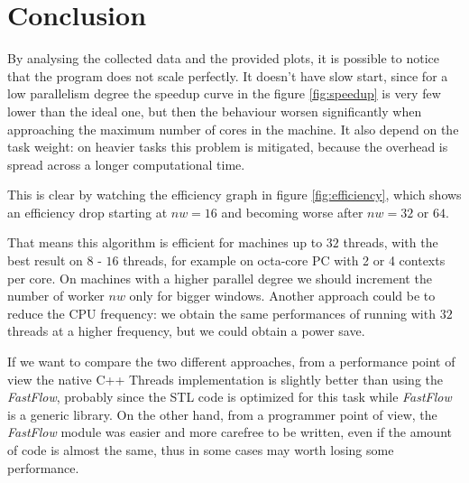 \section{Conclusion}
By analysing the collected data and the provided plots, it is possible to notice that the program does not scale perfectly. It doesn't have slow start, since for a low parallelism degree the speedup curve in the figure \ref{fig:speedup} is very few lower than the ideal one, but then the behaviour worsen significantly when approaching the maximum number of cores in the machine. It also depend on the task weight: on heavier tasks this problem is mitigated, because the overhead is spread across a longer computational time.

This is clear by watching the efficiency graph in figure \ref{fig:efficiency}, which shows an efficiency drop starting at $nw = 16$ and becoming worse after $nw = 32$ or $64$.

That means this algorithm is efficient for machines up to $32$ threads, with the best result on $8$ - $16$ threads, for example on octa-core PC with 2 or 4 contexts per core. On machines with a higher parallel degree we should increment the number of worker $nw$ only for bigger windows. Another approach could be to reduce the CPU frequency: we obtain the same performances of running with $32$ threads at a higher frequency, but we could obtain a power save.

\bigskip\noindent
If we want to compare the two different approaches, from a performance point of view the native C++ Threads implementation is slightly better than using the \textit{FastFlow}, probably since the STL code is optimized for this task while \textit{FastFlow} is a generic library. On the other hand, from a programmer point of view, the \textit{FastFlow} module was easier and more carefree to be written, even if the amount of code is almost the same, thus in some cases may worth losing some performance.